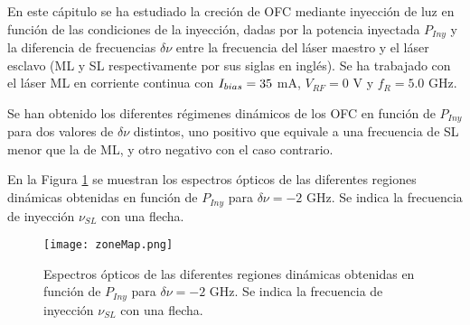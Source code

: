 \graphicspath{{../Graphics/Cpt2-InjectCW/}}

En este c\'apitulo se ha estudiado la creci\'on de OFC mediante inyecci\'on de luz en funci\'on de las condiciones de la inyecci\'on, dadas por la potencia inyectada $P_{Iny}$ y la diferencia de frecuencias $\delta \nu$ entre la frecuencia del l\'aser maestro y el l\'aser esclavo (ML y SL respectivamente por sus siglas en ingl\'es). Se ha trabajado con el l\'aser ML en corriente continua con $I_{bias} = 35$ mA, $V_{RF} = 0$ V y $f_R = 5.0$ GHz.

Se han obtenido los diferentes r\'egimenes din\'amicos de los OFC en funci\'on de $P_{Iny}$ para dos valores de $\delta\nu$ distintos, uno positivo que equivale a una frecuencia de SL menor que la de ML, y otro negativo con el caso contrario.

En la Figura \ref{Img:zonasIO} se muestran los espectros \'opticos de las diferentes regiones din\'amicas obtenidas en funci\'on de $P_{Iny}$ para $\delta\nu = -2$ GHz. Se indica la frecuencia de inyecci\'on $\nu_{SL}$ con una flecha. 

			\begin{figure}[H]
				\centering
				\texttt{[image: zoneMap.png]}
				\caption{\label{Img:zonasIO}Espectros \'opticos de las diferentes regiones din\'amicas obtenidas en funci\'on de $P_{Iny}$ para $\delta\nu = -2$ GHz. Se indica la frecuencia de inyecci\'on $\nu_{SL}$ con una flecha.}
			\end{figure}

